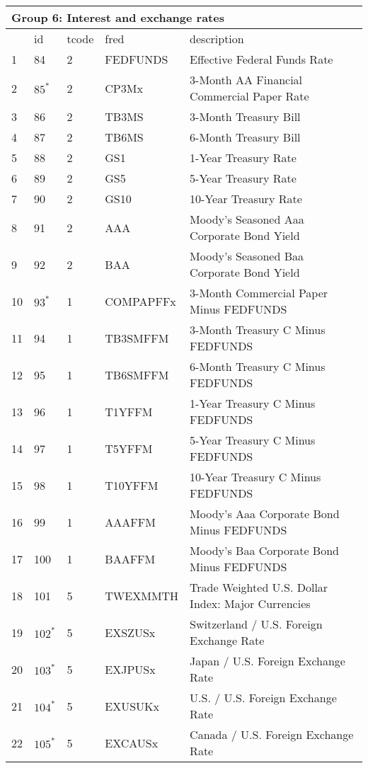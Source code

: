 \begin{table}[ht] 
\centering 
\begin{tabular}{lllll}
\multicolumn{5}{l}{Group 6: Interest and exchange rates} \\
\toprule
 & id & tcode & fred & description \\
\midrule
1 & 84 & 2 & FEDFUNDS & Effective Federal Funds Rate \\
2 & $85^*$ & 2 & CP3Mx & 3-Month AA Financial Commercial Paper Rate \\
3 & 86 & 2 & TB3MS & 3-Month Treasury Bill \\
4 & 87 & 2 & TB6MS & 6-Month Treasury Bill \\
5 & 88 & 2 & GS1 & 1-Year Treasury Rate \\
6 & 89 & 2 & GS5 & 5-Year Treasury Rate \\
7 & 90 & 2 & GS10 & 10-Year Treasury Rate \\
8 & 91 & 2 & AAA & Moody's Seasoned Aaa Corporate Bond Yield \\
9 & 92 & 2 & BAA & Moody's Seasoned Baa Corporate Bond Yield \\
10 & $93^*$ & 1 & COMPAPFFx & 3-Month Commercial Paper Minus FEDFUNDS \\
11 & 94 & 1 & TB3SMFFM & 3-Month Treasury C Minus FEDFUNDS \\
12 & 95 & 1 & TB6SMFFM & 6-Month Treasury C Minus FEDFUNDS \\
13 & 96 & 1 & T1YFFM & 1-Year Treasury C Minus FEDFUNDS \\
14 & 97 & 1 & T5YFFM & 5-Year Treasury C Minus FEDFUNDS \\
15 & 98 & 1 & T10YFFM & 10-Year Treasury C Minus FEDFUNDS \\
16 & 99 & 1 & AAAFFM & Moody's Aaa Corporate Bond Minus FEDFUNDS \\
17 & 100 & 1 & BAAFFM & Moody's Baa Corporate Bond Minus FEDFUNDS \\
\rowcolor{lightgray} 18 & 101 & 5 & TWEXMMTH & Trade Weighted U.S. Dollar Index: Major Currencies \\
19 & $102^*$ & 5 & EXSZUSx & Switzerland / U.S. Foreign Exchange Rate \\
20 & $103^*$ & 5 & EXJPUSx & Japan / U.S. Foreign Exchange Rate \\
21 & $104^*$ & 5 & EXUSUKx & U.S. / U.S. Foreign Exchange Rate \\
22 & $105^*$ & 5 & EXCAUSx & Canada / U.S. Foreign Exchange Rate \\
\bottomrule
\end{tabular}  
\end{table} 